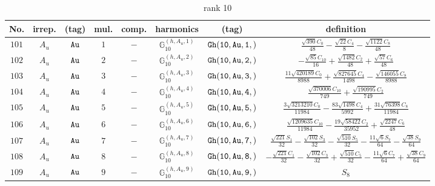 \documentclass[fleqn,8pt]{jsarticle}
\begin{document}
\begin{table}[ht!]
\begin{center}
\caption{rank 10}
\renewcommand{\arraystretch}{1.3}
\begin{tabular}{cccccccc} \hline \hline
No. & irrep. & (tag) & mul. & comp. & harmonics & (tag) & definition \\ \hline
$ 101 $ & $ A_{u} $ & $ {\tt Au} $ & $ 1 $ & $ - $ & $ \mathbb{G}_{10}^{(h,A_{u},1)} $ & $ {\tt Gh(10,Au,1,)} $ & $ \frac{\sqrt{390} C_{0}}{48} - \frac{\sqrt{22} C_{4}}{8} - \frac{\sqrt{1122} C_{8}}{48} $ \\
$ 102 $ & $ A_{u} $ & $ {\tt Au} $ & $ 2 $ & $ - $ & $ \mathbb{G}_{10}^{(h,A_{u},2)} $ & $ {\tt Gh(10,Au,2,)} $ & $ - \frac{\sqrt{85} C_{10}}{16} + \frac{\sqrt{1482} C_{2}}{48} + \frac{\sqrt{57} C_{6}}{48} $ \\
$ 103 $ & $ A_{u} $ & $ {\tt Au} $ & $ 3 $ & $ - $ & $ \mathbb{G}_{10}^{(h,A_{u},3)} $ & $ {\tt Gh(10,Au,3,)} $ & $ \frac{11 \sqrt{420189} C_{0}}{8988} + \frac{\sqrt{827645} C_{4}}{1498} - \frac{\sqrt{146055} C_{8}}{8988} $ \\
$ 104 $ & $ A_{u} $ & $ {\tt Au} $ & $ 4 $ & $ - $ & $ \mathbb{G}_{10}^{(h,A_{u},4)} $ & $ {\tt Gh(10,Au,4,)} $ & $ \frac{\sqrt{370006} C_{10}}{749} + \frac{\sqrt{190995} C_{2}}{749} $ \\
$ 105 $ & $ A_{u} $ & $ {\tt Au} $ & $ 5 $ & $ - $ & $ \mathbb{G}_{10}^{(h,A_{u},5)} $ & $ {\tt Gh(10,Au,5,)} $ & $ \frac{3 \sqrt{3213210} C_{0}}{11984} - \frac{83 \sqrt{1498} C_{4}}{5992} + \frac{31 \sqrt{76398} C_{8}}{11984} $ \\
$ 106 $ & $ A_{u} $ & $ {\tt Au} $ & $ 6 $ & $ - $ & $ \mathbb{G}_{10}^{(h,A_{u},6)} $ & $ {\tt Gh(10,Au,6,)} $ & $ \frac{\sqrt{1209635} C_{10}}{11984} - \frac{19 \sqrt{58422} C_{2}}{35952} + \frac{\sqrt{2247} C_{6}}{48} $ \\
$ 107 $ & $ A_{u} $ & $ {\tt Au} $ & $ 7 $ & $ - $ & $ \mathbb{G}_{10}^{(h,A_{u},7)} $ & $ {\tt Gh(10,Au,7,)} $ & $ \frac{\sqrt{221} S_{1}}{32} - \frac{\sqrt{102} S_{3}}{32} - \frac{\sqrt{510} S_{5}}{32} - \frac{11 \sqrt{6} S_{7}}{64} - \frac{\sqrt{38} S_{9}}{64} $ \\
$ 108 $ & $ A_{u} $ & $ {\tt Au} $ & $ 8 $ & $ - $ & $ \mathbb{G}_{10}^{(h,A_{u},8)} $ & $ {\tt Gh(10,Au,8,)} $ & $ - \frac{\sqrt{221} C_{1}}{32} - \frac{\sqrt{102} C_{3}}{32} + \frac{\sqrt{510} C_{5}}{32} - \frac{11 \sqrt{6} C_{7}}{64} + \frac{\sqrt{38} C_{9}}{64} $ \\
$ 109 $ & $ A_{u} $ & $ {\tt Au} $ & $ 9 $ & $ - $ & $ \mathbb{G}_{10}^{(h,A_{u},9)} $ & $ {\tt Gh(10,Au,9,)} $ & $ S_{8} $ \\

\end{tabular}
\end{center}
\end{table}
\end{document}
